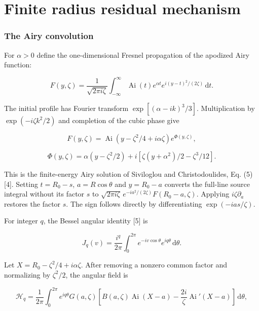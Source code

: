 \section{Finite radius residual
mechanism}\label{finite-radius-residual-mechanism}

\subsubsection*{The Airy convolution}\label{the-airy-convolution}

For \(\alpha>0\) define the one-dimensional Fresnel propagation of the
apodized Airy function:

\begin{equation}F(y,\zeta)=\frac{1}{\sqrt{2\pi i\zeta}}\int_{-\infty}^{\infty}\operatorname{Ai}(t)e^{\alpha t}e^{i(y-t)^2/(2\zeta)}\,\mathrm{d}t.\end{equation}

The initial profile has Fourier transform \(\exp[(\alpha-ik)^3/3]\).
Multiplication by \(\exp(-i\zeta k^2/2)\) and completion of the cubic
phase give

\begin{equation}F(y,\zeta)=\operatorname{Ai}(y-\zeta^2/4+i\alpha\zeta)e^{\Phi(y,\zeta)},\end{equation}

\begin{equation}\Phi(y,\zeta)=\alpha(y-\zeta^2/2)+i[\zeta(y+\alpha^2)/2-\zeta^3/12].\end{equation}

This is the finite-energy Airy solution of Siviloglou and
Christodoulides, Eq. (5) {[}4{]}. Setting \(t=R_0-s\), \(a=R\cos\theta\)
and \(y=R_0-a\) converts the full-line source integral without its
factor \(s\) to
\(\sqrt{2\pi i\zeta}\,e^{-ia^2/(2\zeta)}F(R_0-a,\zeta)\). Applying
\(i\zeta\partial_a\) restores the factor \(s\). The sign follows
directly by differentiating \(\exp(-ias/\zeta)\).

For integer \(q\), the Bessel angular identity {[}5{]} is

\begin{equation}J_q(v)=\frac{i^q}{2\pi}\int_0^{2\pi}e^{-iv\cos\theta}e^{iq\theta}\,\mathrm{d}\theta.\end{equation}

Let \(X=R_0-\zeta^2/4+i\alpha\zeta\). After removing a nonzero common
factor and normalizing by \(\zeta^2/2\), the angular field is

\begin{equation}\mathcal H_q=\frac{1}{2\pi}\int_0^{2\pi}e^{iq\theta}G(a,\zeta)\left[B(a,\zeta)\operatorname{Ai}(X-a)-\frac{2i}{\zeta}\operatorname{Ai}'(X-a)\right]\,\mathrm{d}\theta,\end{equation}

